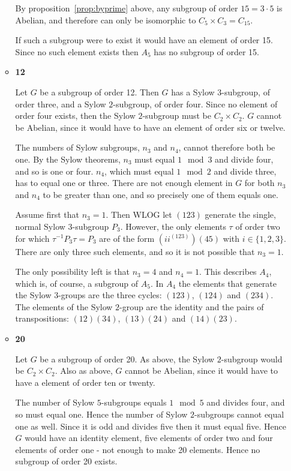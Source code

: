 \documentclass[11pt]{article} \usepackage{amssymb}
\begin{document}
\begin{enumerate}
\begin{itemize}
      By proposition~\ref{prop:byprime} above, any subgroup of order $15=3\cdot 5$
      is Abelian, and therefore can only be isomorphic to 
      $C_5\times C_3=C_{15}$. 

      If such a subgroup were to exist it would have an element of order 15. 
      Since no such element exists then $A_5$ has no subgroup of order 15.

    \item {\bf 12}
      
      Let $G$ be a subgroup of order 12. Then $G$ has a Sylow $3$-subgroup,
      of order three, and a Sylow $2$-subgroup, of order four. Since no 
      element of order four exists, then the Sylow $2$-subgroup must be 
      $C_2\times C_2$. $G$ cannot be Abelian, since it would have to have 
      an element of order six or twelve.

      The numbers of Sylow subgroups, $n_3$ and $n_4$, cannot therefore both
      be one. By the Sylow theorems, $n_3$ must equal $1\mod 3$ and divide
      four, and so is one or four. $n_4$, which must equal $1\mod 2$ and divide
      three, has to equal one or three. There are not enough element in $G$
      for both $n_3$ and $n_4$ to be greater than one, and so precisely one
      of them equals one.

      Assume first that $n_3=1$. Then WLOG let $(123)$ generate the single,
      normal Sylow $3$-subgroup $P_3$. However, the only elements $\tau$ of
      order two for which $\tau^{-1}P_3\tau=P_3$ are of the form $(ii^{(123)})(45)$ with
      $i\in\{1,2,3\}$. There are only three such elements, and so it is not
      possible that $n_3=1$.

      The only possibility left is that $n_3=4$ and $n_4=1$. This describes
      $A_4$, which is, of course, a subgroup of $A_5$. In $A_4$ the elements that
      generate the Sylow $3$-groups are the three cycles: $(123)$, $(124)$ and 
      $(234)$. The elements of the Sylow $2$-group are the identity and the 
      pairs of transpositions: $(12)(34)$, $(13)(24)$ and $(14)(23)$. 
      
    \item {\bf 20}

      Let $G$ be a subgroup of order 20.
      As above, the Sylow $2$-subgroup would
      be $C_2\times C_2$. 
      Also as above, $G$  cannot be Abelian, since it would have
      to have a element of order ten or twenty.

      The number of Sylow $5$-subgroups equals $1\mod 5$ and divides four,
      and so must equal one. Hence the number of Sylow $2$-subgroups cannot
      equal one as well. Since it is odd and divides five then it must equal
      five. Hence $G$ would have an identity element, five elements of order 
      two and four elements of order one - not enough to make 20 elements.
      Hence no subgroup of order 20 exists.


\end{itemize}
\end{enumerate}
\end{document}
